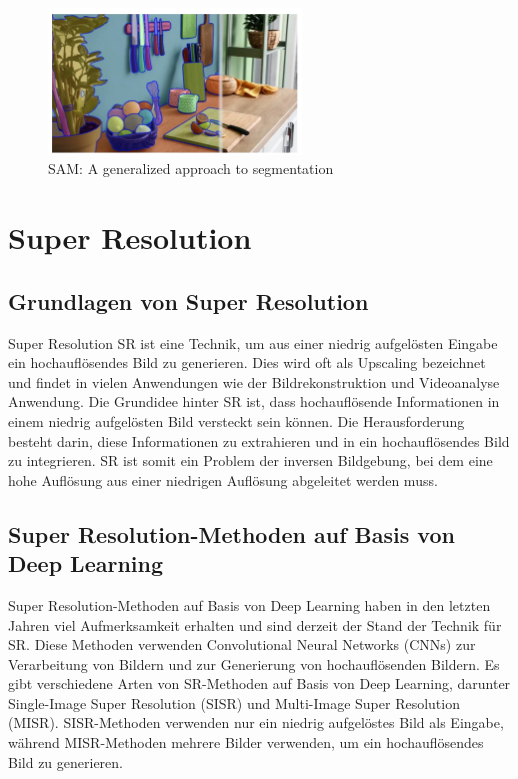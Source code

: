         \begin{figure}[h]
            \centering
            \includegraphics[width=0.6\textwidth]{img/SmartSelect_20230517_135035_Firefox.jpg}
            \caption{SAM: A generalized approach to segmentation}
            \label{fig:facebook_sam}
        \end{figure}

\section{Super Resolution}
    \subsection{Grundlagen von Super Resolution }
    
        Super Resolution \ac{SR} ist eine Technik, um aus einer niedrig aufgelösten Eingabe ein hochauflösendes Bild zu generieren.      
        Dies wird oft als Upscaling bezeichnet und findet in vielen Anwendungen wie der Bildrekonstruktion und Videoanalyse Anwendung.
        Die Grundidee hinter SR ist, dass hochauflösende Informationen in einem niedrig aufgelösten Bild versteckt sein können.      
        Die Herausforderung besteht darin, diese Informationen zu extrahieren und in ein hochauflösendes Bild zu integrieren.      
        SR ist somit ein Problem der inversen Bildgebung, bei dem eine hohe Auflösung aus einer niedrigen Auflösung abgeleitet werden muss.
        
    \subsection{Super Resolution-Methoden auf Basis von Deep Learning}
    
        Super Resolution-Methoden auf Basis von Deep Learning haben in den letzten Jahren viel Aufmerksamkeit erhalten und sind derzeit der Stand der Technik für SR.      
        Diese Methoden verwenden Convolutional Neural Networks (CNNs) zur Verarbeitung von Bildern und zur Generierung von hochauflösenden Bildern.
        Es gibt verschiedene Arten von SR-Methoden auf Basis von Deep Learning, darunter Single-Image Super Resolution (SISR) und Multi-Image Super Resolution (MISR).      
        SISR-Methoden verwenden nur ein niedrig aufgelöstes Bild als Eingabe, während MISR-Methoden mehrere Bilder verwenden, um ein hochauflösendes Bild zu generieren.

